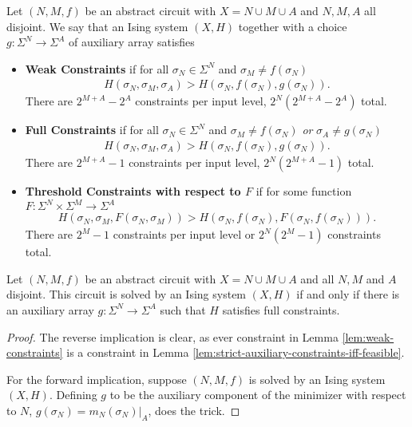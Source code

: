 \documentclass{article}
\begin{document}
\begin{defn}\label{defn:constraints}
  Let $(N,M,f)$ be an abstract circuit with $X = N \cup M \cup A$ and $N, M, A$ all disjoint. We say that an Ising system $(X, H)$ together with a choice $g: \Sigma^N\to \Sigma^A$ of auxiliary array satisfies
  \begin{itemize}
    \item \textbf{Weak Constraints} if for all $\sigma_N \in \Sigma^N$ and $\sigma_M \neq f(\sigma_N)$
      \begin{align*}
        H(\sigma_N, \sigma_M, \sigma_A) > H(\sigma_N, f(\sigma_N), g(\sigma_N)).
      \end{align*}
      There are $2^{M + A} - 2^A$ constraints per input level, $2^N(2^{M+A} - 2^A)$ total.
    \item \textbf{Full Constraints} if for all $\sigma_N \in \Sigma^N$ and $\sigma_M \neq f(\sigma_N)$ \emph{or} $\sigma_A \neq g(\sigma_N)$
      \begin{align*}
        H(\sigma_N, \sigma_M, \sigma_A) > H(\sigma_N, f(\sigma_N), g(\sigma_N)).
      \end{align*}
      There are $2^{M+A} - 1$ constraints per input level, $2^N(2^{M+A} - 1)$ total.
    \item \textbf{Threshold Constraints with respect to $F$} if for some function $F:\Sigma^{N} \times \Sigma^M \to \Sigma^A$
      \begin{align*}
        H(\sigma_N, \sigma_M, F(\sigma_N, \sigma_M)) > H(\sigma_N, f(\sigma_N), F(\sigma_N, f(\sigma_N))).
      \end{align*}
      There are $2^M - 1$ constraints per input level or $2^N(2^M - 1)$ constraints total.
  \end{itemize}
\end{defn}


\begin{lem}\label{lem:full-constraints}
  Let $(N, M, f)$ be an abstract circuit with $X = N \cup M \cup A$ and all $N, M$ and $A$ disjoint. This circuit is solved by an Ising system $(X, H)$ if and only if there is an auxiliary array $g:\Sigma^N \to \Sigma^A$ such that $H$ satisfies full constraints.
\end{lem}
\begin{proof}
  The reverse implication is clear, as ever constraint in Lemma \ref{lem:weak-constraints} is a constraint in Lemma \ref{lem:strict-auxiliary-constraints-iff-feasible}. 

  For the forward implication, suppose $(N,M,f)$ is solved by an Ising system $(X,H)$. Defining $g$ to be the auxiliary component of the minimizer with respect to $N$, $g(\sigma_N) = m_N(\sigma_N)|_{A}$, does the trick.
\end{proof}
\end{document}
